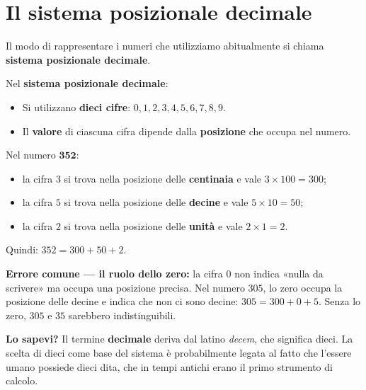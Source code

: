 \section{Il sistema posizionale decimale}

Il modo di rappresentare i numeri che utilizziamo abitualmente
si chiama \textbf{sistema posizionale decimale}.

\begin{definizione}
  Nel \textbf{sistema posizionale decimale}:
  \begin{itemize}
    \item Si utilizzano \textbf{dieci cifre}: $0, 1, 2, 3, 4, 5, 6, 7, 8, 9$.
    \item Il \textbf{valore} di ciascuna cifra dipende dalla
          \textbf{posizione} che occupa nel numero.
  \end{itemize}
\end{definizione}

\begin{esempio}
  Nel numero $\mathbf{352}$:
  \begin{itemize}
    \item la cifra $3$ si trova nella posizione delle \textbf{centinaia}
          e vale $3 \times 100 = 300$;
    \item la cifra $5$ si trova nella posizione delle \textbf{decine}
          e vale $5 \times 10 = 50$;
    \item la cifra $2$ si trova nella posizione delle \textbf{unità}
          e vale $2 \times 1 = 2$.
  \end{itemize}
  Quindi: $352 = 300 + 50 + 2$.
\end{esempio}

\begin{attenzione}
  \textbf{Errore comune — il ruolo dello zero:}
  la cifra $0$ non indica «nulla da scrivere» ma occupa una posizione precisa.
  Nel numero $305$, lo zero occupa la posizione delle decine
  e indica che non ci sono decine: $305 = 300 + 0 + 5$.
  Senza lo zero, $305$ e $35$ sarebbero indistinguibili.
\end{attenzione}

\begin{sapevi}
  \textbf{Lo sapevi?}
  Il termine \textbf{decimale} deriva dal latino \emph{decem}, che significa dieci.
  La scelta di dieci come base del sistema è probabilmente legata
  al fatto che l'essere umano possiede dieci dita,
  che in tempi antichi erano il primo strumento di calcolo.
\end{sapevi}

